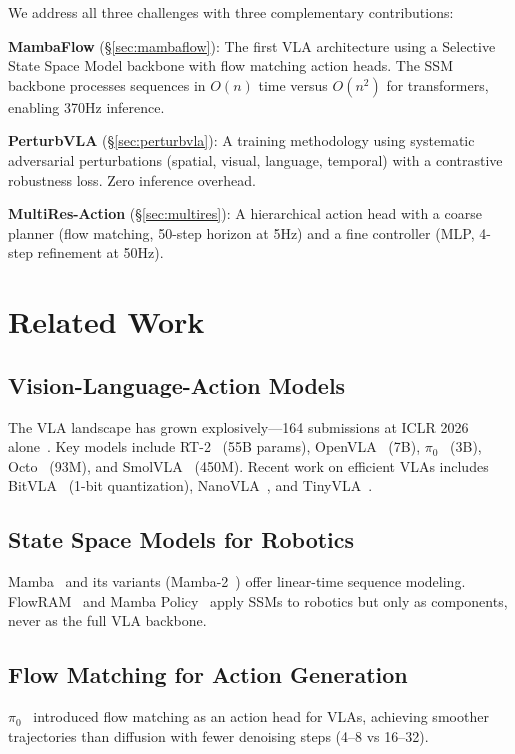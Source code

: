 \documentclass[11pt]{article}
\begin{document}
We address all three challenges with three complementary contributions:

\textbf{MambaFlow} (\S\ref{sec:mambaflow}): The first VLA architecture using a Selective State Space Model backbone with flow matching action heads. The SSM backbone processes sequences in $O(n)$ time versus $O(n^2)$ for transformers, enabling 370Hz inference.

\textbf{PerturbVLA} (\S\ref{sec:perturbvla}): A training methodology using systematic adversarial perturbations (spatial, visual, language, temporal) with a contrastive robustness loss. Zero inference overhead.

\textbf{MultiRes-Action} (\S\ref{sec:multires}): A hierarchical action head with a coarse planner (flow matching, 50-step horizon at 5Hz) and a fine controller (MLP, 4-step refinement at 50Hz).

\section{Related Work}

\subsection{Vision-Language-Action Models}
The VLA landscape has grown explosively---164 submissions at ICLR 2026 alone~\cite{vla_iclr2026}. Key models include RT-2~\cite{brohan2023rt2} (55B params), OpenVLA~\cite{kim2024openvla} (7B), $\pi_0$~\cite{black2024pi0} (3B), Octo~\cite{octo2024} (93M), and SmolVLA~\cite{smolvla2025} (450M). Recent work on efficient VLAs includes BitVLA~\cite{bitvla2025} (1-bit quantization), NanoVLA~\cite{nanovla2025}, and TinyVLA~\cite{tinyvla2025}.

\subsection{State Space Models for Robotics}
Mamba~\cite{gu2024mamba} and its variants (Mamba-2~\cite{mamba2_2024}) offer linear-time sequence modeling. FlowRAM~\cite{flowram2025} and Mamba Policy~\cite{mambapolicy2025} apply SSMs to robotics but only as components, never as the full VLA backbone.

\subsection{Flow Matching for Action Generation}
$\pi_0$~\cite{black2024pi0} introduced flow matching as an action head for VLAs, achieving smoother trajectories than diffusion with fewer denoising steps (4--8 vs 16--32).
\end{document}
